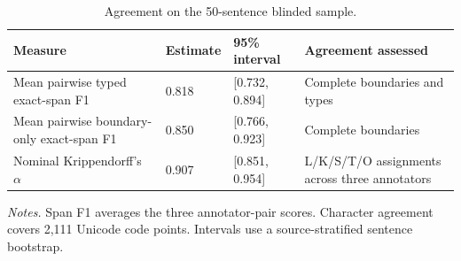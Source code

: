 \documentclass[fleqn,12pt]{wlpeerj}
\begin{document}
\setcounter{table}{3}
\begin{table}[!htbp]
\caption{Agreement on the 50-sentence blinded sample.}
\label{tab:quality-main}
\centering\small
\setlength{\tabcolsep}{4pt}
\begin{tabularx}{\linewidth}{@{}P{.29\linewidth}P{.11\linewidth}P{.22\linewidth}L@{}}
\toprule
Measure & Estimate & 95\% interval & Agreement assessed \\
\midrule
Mean pairwise typed exact-span F1 & 0.818 & [0.732, 0.894] & Complete boundaries and types \\
Mean pairwise boundary-only exact-span F1 & 0.850 & [0.766, 0.923] & Complete boundaries \\
Nominal Krippendorff's $\alpha$ & 0.907 & [0.851, 0.954] & L/K/S/T/O assignments across three annotators \\
\bottomrule
\end{tabularx}
\par\smallskip
{\footnotesize\RaggedRight\textit{Notes.} Span F1 averages the three annotator-pair scores. Character agreement covers 2,111 Unicode code points. Intervals use a source-stratified sentence bootstrap.\par}
\end{table}

\end{document}
